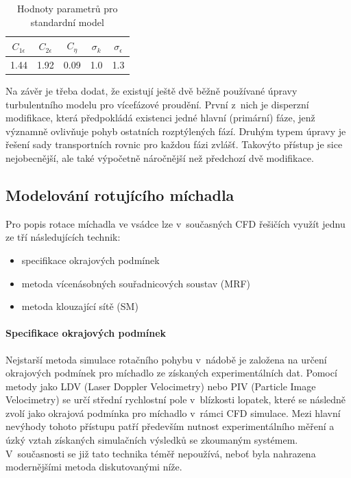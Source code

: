 \begin{table}[h!]
\centering
\caption{Hodnoty parametrů pro standardní \keps{} model}
\label{tab:const}
\begin{tabular}{ccccc}
\toprule
$C_{1\epsilon}$ & $C_{2\epsilon}$ & $C_{\eta}$ &  $\sigma_{k}$ & $\sigma_{\epsilon}$\\
\midrule
\num{1.44} & \num{1.92} & \num{0.09} & \num{1.0} & \num{1.3} \\
\bottomrule
\end{tabular}
\end{table}

Na závěr je třeba dodat, že existují ještě dvě běžně používané úpravy \keps{} turbulentního modelu pro vícefázové proudění. První z~nich je disperzní modifikace, která předpokládá existenci jedné hlavní (primární) fáze, jenž významně ovlivňuje pohyb ostatních rozptýlených fází. Druhým typem úpravy je řešení sady transportních rovnic \keps{} pro každou fázi zvlášť. Takovýto přístup je sice nejobecnější, ale také výpočetně náročnější než předchozí dvě modifikace. 

\subsection{Modelování rotujícího míchadla}
Pro popis rotace míchadla ve vsádce lze v~současných CFD řešičích využít jednu ze tří následujících technik:
\begin{itemize}[itemsep=0pt,parsep=0pt,partopsep=0pt,topsep=0pt]
  \item specifikace okrajových podmínek
  \item metoda vícenásobných souřadnicových soustav (MRF) 
  \item metoda klouzající sítě (SM) 
\end{itemize} 

\paragraph{Specifikace okrajových podmínek}
Nejstarší metoda simulace rotačního pohybu v~nádobě je založena na určení okrajových podmínek pro míchadlo ze získaných experimentálních  dat. Pomocí metody jako LDV (Laser Doppler Velocimetry) nebo PIV (Particle Image Velocimetry) se určí střední rychlostní pole v~blízkosti lopatek, které se následně zvolí jako okrajová podmínka pro míchadlo v~rámci CFD simulace. Mezi hlavní nevýhody tohoto přístupu patří především  nutnost experimentálního měření a úzký vztah získaných simulačních výsledků se zkoumaným systémem. V~současnosti se již tato technika téměř nepoužívá, neboť byla nahrazena modernějšími metoda diskutovanými níže.

